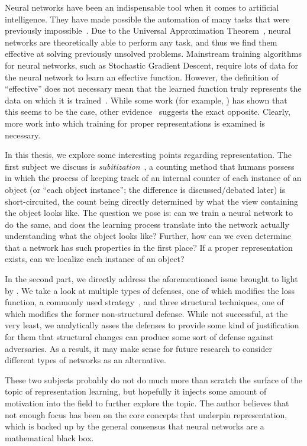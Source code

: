 Neural networks have been an indispensable tool when it comes to artificial intelligence. They have
made possible the automation of many tasks that were previously impossible~\cite{redmon2016look,
ILSVRC15}. Due to the Universal Approximation Theorem~\cite{HORNIK1989359}, neural networks are
theoretically able to perform any task, and thus we find them effective at solving previously
unsolved problems. Mainstream training algorithms for neural networks, such as Stochastic Gradient
Descent, require lots of data for the neural network to learn an effective function. However, the
definition of ``effective'' does not necessary mean that the learned function truly represents the
data on which it is trained~\cite{szegedy2014intriguing}. While some work (for example,
\cite{yosinski2015understanding}) has shown that this seems to be the case, other
evidence~\cite{szegedy2014intriguing} suggests the exact opposite. Clearly, more work into which
training for proper representations is examined is necessary.

In this thesis, we explore some interesting points regarding representation. The first subject we
discuss is \textit{subitization}~\cite{10.2307/1418556, subitizingyoutube}, a counting method that
humans possess in which the process of keeping track of an internal counter of each instance of an
object (or ``each object instance''; the difference is discussed/debated later) is short-circuited,
the count being directly determined by what the view containing the object looks like. The question
we pose is: can we train a neural network to do the same, and does the learning process translate
into the network actually understanding what the object looks like? Further, how can we even
determine that a network has such properties in the first place? If a proper representation exists,
can we localize each instance of an object?

In the second part, we directly address the aforementioned issue brought to light by
\cite{szegedy2014intriguing}. We take a look at multiple types of defenses, one of which modifies
the loss function, a commonly used strategy~\cite{goodfellow2015explaining, kannan2018adversarial,
madry2019deep}, and three structural techniques, one of which modifies the former non-structural
defense. While not successful, at the very least, we analytically asses the defenses to provide some
kind of justification for them that structural changes can produce some sort of defense against
adversaries. As a result, it may make sense for future research to consider different types of
networks as an alternative.

These two subjects probably do not do much more than scratch the surface of the topic of
representation learning, but hopefully it injects some amount of motivation into the field to
further explore the topic. The author believes that not enough focus has been on the core concepts
that underpin representation, which is backed up by the general consensus that neural networks are a
mathematical black box.